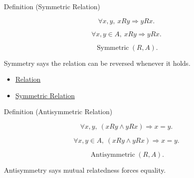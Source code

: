 \begin{definitionbox}{Definition (Symmetric Relation)}
\begin{definition}
\label{def:symmetric-relation}
\[
\forall x,y,\ xRy \Longrightarrow yRx.
\]
\end{definition}
\end{definitionbox}

\begin{remark*}
\[
\forall x,y\in A,\ xRy \Longrightarrow yRx.
\]
\end{remark*}

\begin{remark*}
\[
\operatorname{Symmetric}(R,A).
\]
\end{remark*}

\begin{remark*}[Interpretation]
Symmetry says the relation can be reversed whenever it holds.
\end{remark*}

\begin{dependencies}
\begin{itemize}
  \item \hyperref[def:relation]{Relation}
  \item \hyperref[def:symmetric]{Symmetric Relation}
\end{itemize}
\end{dependencies}

\begin{definitionbox}{Definition (Antisymmetric Relation)}
\begin{definition}
\label{def:antisymmetric-relation}
\[
\forall x,y,\ (xRy\land yRx)\Longrightarrow x=y.
\]
\end{definition}
\end{definitionbox}

\begin{remark*}
\[
\forall x,y\in A,\ (xRy\land yRx)\Longrightarrow x=y.
\]
\end{remark*}

\begin{remark*}
\[
\operatorname{Antisymmetric}(R,A).
\]
\end{remark*}

\begin{remark*}[Interpretation]
Antisymmetry says mutual relatedness forces equality.
\end{remark*}

